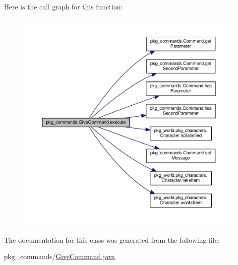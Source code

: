 Here is the call graph for this function\-:
\nopagebreak
\begin{figure}[H]
\begin{center}
\leavevmode
\includegraphics[width=350pt]{classpkg__commands_1_1GiveCommand_a3a3cca7fae9b86d8ff85cc166564843d_cgraph}
\end{center}
\end{figure}




The documentation for this class was generated from the following file\-:\begin{DoxyCompactItemize}
\item 
pkg\-\_\-commands/\hyperlink{GiveCommand_8java}{Give\-Command.\-java}\end{DoxyCompactItemize}
